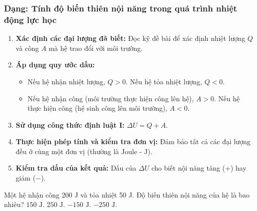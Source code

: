 \subsubsection{Dạng: Tính độ biến thiên nội năng trong quá trình nhiệt động lực học}
\begin{phuongphap}
\begin{enumerate}
    \item \textbf{Xác định các đại lượng đã biết:} Đọc kỹ đề bài để xác định nhiệt lượng $Q$ và công $A$ mà hệ trao đổi với môi trường.
    \item \textbf{Áp dụng quy ước dấu:}
    \begin{itemize}
        \item Nếu hệ nhận nhiệt lượng, $Q > 0$. Nếu hệ tỏa nhiệt lượng, $Q < 0$.
        \item Nếu hệ nhận công (môi trường thực hiện công lên hệ), $A > 0$. Nếu hệ thực hiện công (hệ sinh công lên môi trường), $A < 0$.
    \end{itemize}
    \item \textbf{Sử dụng công thức định luật I:} $\Delta U = Q + A$.
    \item \textbf{Thực hiện phép tính và kiểm tra đơn vị:} Đảm bảo tất cả các đại lượng đều ở cùng một đơn vị (thường là Joule - J).
    \item \textbf{Kiểm tra dấu của kết quả:} Dấu của $\Delta U$ cho biết nội năng tăng ($+$) hay giảm ($-$).
\end{enumerate}
\end{phuongphap}
\begin{vidumau}
Một hệ nhận công 200 J và tỏa nhiệt 50 J. Độ biến thiên nội năng của hệ là bao nhiêu?
\choice
{\True $150 \text{ J}$.}
{$250 \text{ J}$.}
{$-150 \text{ J}$.}
{$-250 \text{ J}$.}
\end{vidumau}


